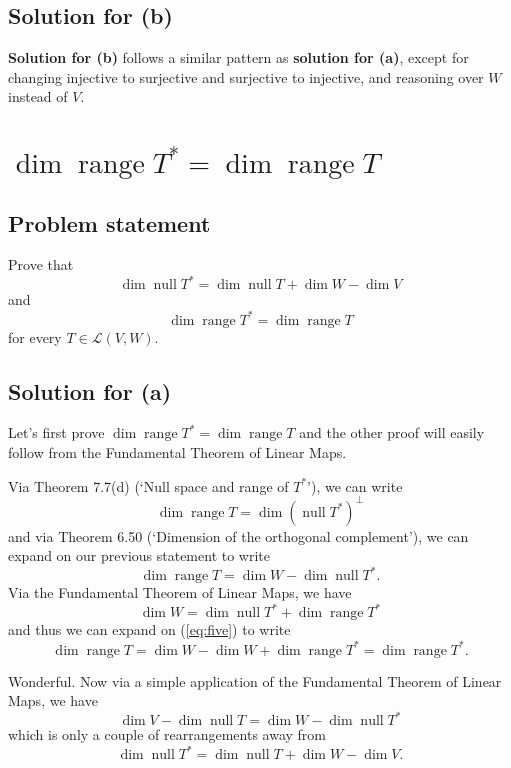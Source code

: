 \documentclass{article}
\begin{document}
\subsection*{Solution for (b)}
\textbf{Solution for (b)} follows a similar pattern as \textbf{solution for (a)}, except for changing injective to surjective and surjective to injective, and reasoning over $W$ instead of $V$.

\clearpage

\section{$\operatorname{dim}\operatorname{range}T^*=\operatorname{dim}\operatorname{range}T$}
\subsection*{Problem statement}
Prove that
\[\operatorname{dim}\operatorname{null}T^*=\operatorname{dim}\operatorname{null}T+\operatorname{dim}W-\operatorname{dim}V\]
and
\[\operatorname{dim}\operatorname{range}T^*=\operatorname{dim}\operatorname{range}T\]
for every $T\in\mathcal{L}(V,W)$.

\subsection*{Solution for (a)}
Let's first prove $\operatorname{dim}\operatorname{range}T^*=\operatorname{dim}\operatorname{range}T$ and the other proof will easily follow from the Fundamental Theorem of Linear Maps.

Via Theorem 7.7(d) (`Null space and range of $T^*$'), we can write
\[\operatorname{dim}\operatorname{range}T=\operatorname{dim}(\operatorname{null}T^*)^\bot\]
and via Theorem 6.50 (`Dimension of the orthogonal complement'), we can expand on our previous statement to write
\begin{equation}\label{eq:five}
    \operatorname{dim}\operatorname{range}T=\operatorname{dim}W-\operatorname{dim}\operatorname{null}T^*.
\end{equation}
Via the Fundamental Theorem of Linear Maps, we have
\[\operatorname{dim}W=\operatorname{dim}\operatorname{null}T^*+\operatorname{dim}\operatorname{range}T^*\]
and thus we can expand on (\ref{eq:five}) to write
\[\operatorname{dim}\operatorname{range}T=\operatorname{dim}W-\operatorname{dim}W+\operatorname{dim}\operatorname{range}T^*=\operatorname{dim}\operatorname{range}T^*.\]

Wonderful. Now via a simple application of the Fundamental Theorem of Linear Maps, we have
\[\operatorname{dim}V-\operatorname{dim}\operatorname{null}T=\operatorname{dim}W-\operatorname{dim}\operatorname{null}T^*\]
which is only a couple of rearrangements away from 
\[\operatorname{dim}\operatorname{null}T^*=\operatorname{dim}\operatorname{null}T+\operatorname{dim}W-\operatorname{dim}V.\]
\end{document}
